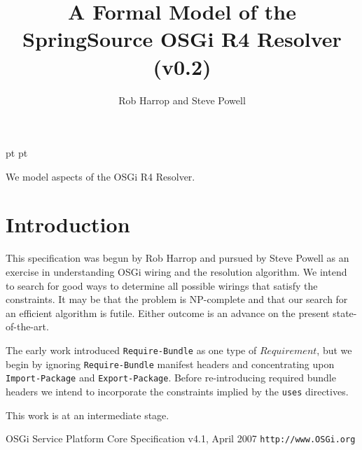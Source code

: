 \documentclass[a4paper,12pt]{article}
\begin{document}
 pt
 pt

\title{A Formal Model of the SpringSource OSGi R4 Resolver (v0.2)}
\author{Rob Harrop and Steve Powell}
\maketitle
\thispagestyle{myheadings}
\setcounter{page}{0}

We model aspects of the OSGi R4 Resolver.


\newcommand{\true}{true}
\newcommand{\false}{false}
\newcommand{\ModuleDefZero}{ModuleDef_0}
\newcommand{\ModuleDefOne}{ModuleDef_1}
\newcommand{\ModuleDefTwo}{ModuleDef_2}
\newcommand{\ModuleDefThree}{ModuleDef_3}
\newcommand{\ModuleDefFour}{ModuleDef_4}


\clearpage
\tableofcontents
\clearpage
{}
\section{Introduction}
This specification was begun by Rob Harrop and pursued by Steve Powell as an exercise in understanding OSGi wiring and the resolution algorithm. We intend to search for good ways to determine all possible wirings that satisfy the constraints. It may be that the problem is NP-complete and that our search for an efficient algorithm is futile. Either outcome is an advance on the present state-of-the-art.

The early work introduced {\tt Require-Bundle} as one type of $Requirement$, but we begin by ignoring {\tt Require-Bundle} manifest headers and concentrating upon {\tt Import-Package} and {\tt Export-Package}. Before re-introducing required bundle headers we intend to incorporate the constraints implied by the {\tt uses} directives.

This work is at an intermediate stage.

\begin{thebibliography}{99}
     OSGi Service Platform Core Specification v4.1, April 2007 {\tt http://www.OSGi.org}
\end{thebibliography}
    
\end{document}
